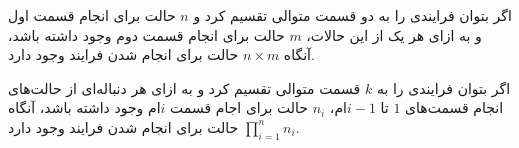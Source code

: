 \begin{definition}
    \p
    اگر بتوان فرایندی را به دو قسمت متوالی تقسیم کرد و
    $n$
    حالت برای انجام قسمت اول و به ازای هر یک از این حالات،
    $m$
    حالت برای انجام قسمت دوم وجود داشته باشد،
    آنگاه
    $n \times m$
    حالت برای انجام شدن فرایند وجود دارد.
\end{definition}
    
\begin{fact}
    \p
    اگر بتوان فرایندی را به
    $k$
    قسمت متوالی تقسیم کرد و
    به ازای هر دنباله‌ای از حالت‌های انجام قسمت‌های 
    $1$ تا $i-1$ام،
    $n_i$
    حالت برای اجام قسمت
    $i$ام
    وجود داشته باشد،
    آنگاه
    $\prod\limits_{i=1}^n n_i$
    حالت برای انجام شدن فرایند وجود دارد.
\end{fact}





